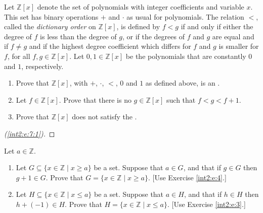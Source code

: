 \Newpage
\begin{exercise} %
	Let $\mathbb{Z}[x]$ denote the set of polynomials with integer coefficients and variable $x$. This set has binary operations $+$ and $\cdot$ as usual for polynomials. The relation $<$, called the \emph{dictionary order} on $\mathbb{Z}[x]$, is defined by $f < g$ if and only if either the degree of $f$ is less than the degree of $g$, or if the degrees of $f$ and $g$ are equal and if $f \neq g$ and if the highest degree coefficient which differs for $f$ and $g$ is smaller for $f$, for all $f, g \in \mathbb{Z}[x]$. Let $0, 1 \in \mathbb{Z}[x]$ be the polynomials that are constantly $0$ and $1$, respectively.
	\begin{enumerate}
		\item \label{int2:e:7:1}
		      Prove that $\mathbb{Z}[x]$, with $+$, $\cdot$, $<$, $0$ and $1$ as defined above, is an .
		\item \label{int2:e:7:2}
		      Let $f \in \mathbb{Z}[x]$. Prove that there is no $g \in \mathbb{Z}[x]$ such that $f < g < f + 1$.
		\item \label{int2:e:7:3}
		      Prove that $\mathbb{Z}[x]$ does not satisfy the .
	\end{enumerate}
\end{exercise}

\begin{proof}[(\ref{int2:e:7:1})]
	\TBD
\end{proof}




\Newpage
\intiiLessRelL*

\begin{exercise} %
	\label{int2:e:8}
	Let $a \in \mathbb{Z}$.
	\begin{enumerate}
		\item \label{int2:e:8:1}
		      Let $G \subseteq \{ x \in \mathbb{Z} \mid x \geq a \}$ be a set. Suppose that $a \in G$, and that if $g \in G$ then $g + 1 \in G$. Prove that $G = \{ x \in \mathbb{Z} \mid x \geq a \}$.
		      \hfill [Use Exercise \ref{int2:e:4}.]
		\item \label{int2:e:8:2}
		      Let $H \subseteq \{x \in \mathbb{Z} \mid x \leq a \}$ be a set. Suppose that $a \in H$, and that if $h \in H$ then $h + (-1) \in H$. Prove that $H = \{ x \in \mathbb{Z} \mid x \leq a \}$.
		      \hfill [Use Exercise \ref{int2:e:3}.]
	\end{enumerate}

\end{exercise}

